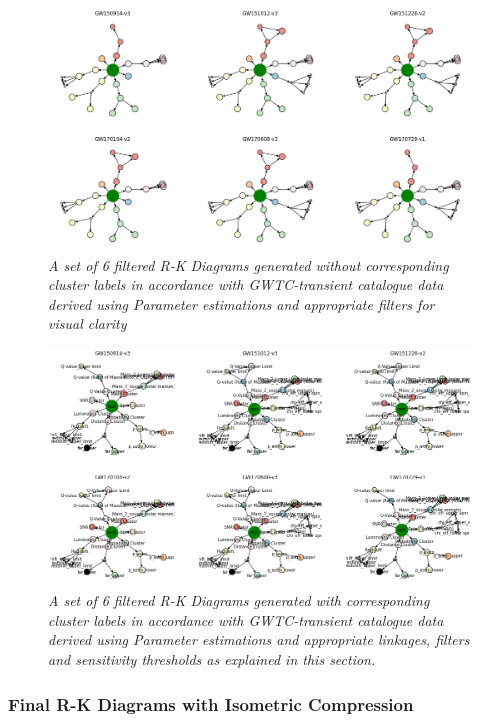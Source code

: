 \begin{figure}[t]
    \centering
        \includegraphics[width=1.0\linewidth]{images/Filtered CBC R-K Diagrams without labels.png}
        \caption{\textit{A set of 6 filtered R-K Diagrams generated without corresponding cluster labels in accordance with GWTC-transient catalogue data derived using Parameter estimations and appropriate filters for visual clarity }}
    \label{fig:CBC_RKD_without_Labels}
\end{figure}
    

\begin{figure}[t]
    \centering
        \includegraphics[width=1.0\linewidth]{images/Filtered CBC R-K Diagrams with Labels.png}
        \caption{\textit{A set of 6 filtered R-K Diagrams generated with corresponding cluster labels in accordance with GWTC-transient catalogue data derived using Parameter estimations and appropriate linkages, filters and sensitivity thresholds as explained in this section.}}
    \label{fig:CBC_RKD_with_Labels}
\end{figure}
    
    
\subsubsection{Final R-K Diagrams with Isometric Compression}
    
